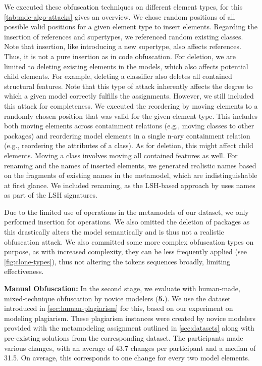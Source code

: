 We executed these obfuscation techniques on different element types, for this \autoref{tab:mde-algo-attacks} gives an overview.
We chose random positions of all possible valid positions for a given element type to insert elements. 
Regarding the insertion of references and supertypes, we referenced random existing classes. Note that insertion, like introducing a new supertype, also affects references. Thus, it is not a pure insertion as in code obfuscation.
%
For deletion, we are limited to deleting existing elements in the models, which also affects potential child elements. For example, deleting a classifier also deletes all contained structural features. Note that this type of attack inherently affects the degree to which a given model correctly fulfills the assignments. However, we still included this attack for completeness.
%
We executed the reordering by moving elements to a randomly chosen position that was valid for the given element type.
This includes both moving elements across containment relations (e.g., moving classes to other packages) and reordering model elements in a single n-ary containment relation (e.g., reordering the attributes of a class). As for deletion, this might affect child elements. Moving a class involves moving all contained features as well.
%
For renaming and the names of inserted elements, we generated realistic names based on the fragments of existing names in the metamodel, which are indistinguishable at first glance. We included renaming, as the LSH-based approach by \citet{Martinez2020} uses names as part of the LSH signatures.

Due to the limited use of operations in the metamodels of our dataset, we only performed insertion for operations.
We also omitted the deletion of packages as this drastically alters the model semantically and is thus not a realistic obfuscation attack.
We also committed some more complex obfuscation types on purpose, as with increased complexity, they can be less frequently applied (see \autoref{fig:clone-types}), thus not altering the tokens sequences broadly, limiting effectiveness.


\textbf{Manual Obfuscation:}
In the second stage, we evaluate with human-made, mixed-technique obfuscation by novice modelers (\textbf{5.}).
We use the dataset introduced in \autoref{sec:human-plagiarism} for this, based on our experiment on modeling plagiarism. These plagiarism instances were created by novice modelers provided with the metamodeling assignment outlined in \autoref{sec:datasets} along with pre-existing solutions from the corresponding dataset. The participants made various changes, with an average of 43.7 changes per participant and a median of 31.5. On average, this corresponds to one change for every two model elements.


